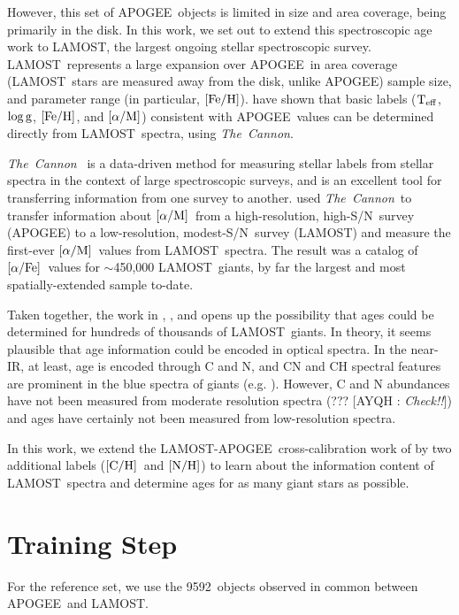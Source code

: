 \documentclass[12pt, preprint]{aastex}
\newcommand{\tc}{\textsl{The~Cannon}}
\newcommand{\apogee}{APOGEE}
\newcommand{\lamost}{LAMOST}
\newcommand{\teff}{\mbox{$\rm T_{eff}$}}
\newcommand{\logg}{\mbox{$\rm \log g$}}
\newcommand{\feh}{\mbox{$\rm [Fe/H]$}}
\newcommand{\afe}{\mbox{$\rm [\alpha/Fe]$}}
\newcommand{\alpham}{\mbox{$\rm [\alpha/M]$}}
\newcommand{\carbon}{\mbox{$\rm [C/H]$}}
\newcommand{\nitrogen}{\mbox{$\rm [N/H]$}}
\newcommand{\ntrobj}{9592}
\newcommand{\snr}{S/N}
\newcommand{\Comment}[2]{ [{\color{red}\sc #1 :} {{\color{cyan} \it #2}}]}
\begin{document}
However, this set of \apogee\ objects is limited in size and area coverage, being primarily in the disk.
In this work, we set out to extend this spectroscopic age work to
\lamost, the largest ongoing stellar spectroscopic survey. 
\lamost\ represents a large expansion over \apogee\ in area coverage
(\lamost\ stars are measured away from the disk, unlike \apogee)
sample size, and parameter range (in particular, \feh). 
\citet{Ho2016} have shown that
basic labels (\teff, \logg, \feh, and \alpham) consistent with 
\apogee\ values can be determined directly from \lamost\ spectra,
using \tc.

\tc\ \citep{Ness2015} is a data-driven method for measuring stellar labels from stellar spectra in the context of large spectroscopic surveys, and is an excellent tool for transferring information from one survey to another. 
\citet{Ho2016} used \tc\ to transfer information about \alpham\ from a
high-resolution, high-\snr\ survey (\apogee) to a low-resolution,
modest-\snr\ survey (\lamost) and measure the first-ever \alpham\ values
from \lamost\ spectra. The result was a catalog of \afe\ values for $\sim$450,000 \lamost\ giants, by far the largest and most spatially-extended
sample to-date. 

Taken together, the work in \citet{Martig2016}, \citet{Ness2016}, and
\citet{Ho2016} opens up the possibility that ages could be determined
for hundreds of thousands of \lamost\ giants.
In theory, it seems plausible that age information could
be encoded in optical spectra.
In the near-IR, at least, age is encoded through C and N, and
CN and CH spectral features
are prominent in the blue spectra of giants 
(e.g. \citet{Martell2008}). However, C and N abundances
have not been measured from moderate resolution spectra (???
\Comment{AYQH}{Check!!}) and ages have certainly not been
measured from low-resolution spectra.

In this work, we extend the \lamost-\apogee\ cross-calibration 
work of \citet{Ho2016} by two additional labels (\carbon\ and \nitrogen) 
to learn about the information content of \lamost\ spectra
and determine ages for as many giant stars as possible.

\section{Training Step}
\label{sec:training}

For the reference set, we use the 
\ntrobj\ objects observed in common between
\apogee\ and \lamost.
\end{document}
